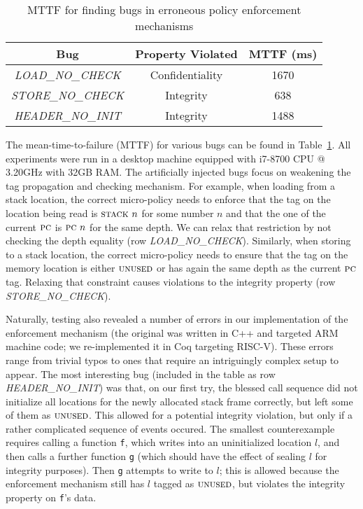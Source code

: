\documentclass[acmsmall,review,anonymous]{acmart}\settopmatter{printfolios=true,printccs=false,printacmref=false}
\begin{document}
{\begin{table}[]
\centering
\begin{tabular}{c|c|c}
  Bug & Property Violated & MTTF (ms) \\
  \hline
      {\em LOAD\_NO\_CHECK}  & Confidentiality & 1670 \\
      {\em STORE\_NO\_CHECK} & Integrity & 638 \\
      {\em HEADER\_NO\_INIT} & Integrity & 1488 \\
\end{tabular}
\vspace*{1em}
\caption{MTTF for finding bugs in erroneous policy enforcement mechanisms}
\vspace*{-2em}
\label{tab:bug-table}
\end{table}

The mean-time-to-failure (MTTF) for various bugs can be found in
Table~\ref{tab:bug-table}. All experiments were run in a desktop
machine equipped with i7-8700 CPU @ 3.20GHz with 32GB
RAM. 
%
The artificially injected bugs focus on weakening the tag propagation
and checking mechanism.
%
For example, when loading from a stack location, the correct
micro-policy needs to enforce that the tag on the location being read
is $\textsc{stack} ~ n$ for some number $n$ and that the one of the
current $\textsc{pc}$ is $\textsc{pc} ~ n$ for the same depth. We can relax
that restriction by not checking the depth equality (row {\em
  LOAD\_NO\_CHECK}).
%
Similarly, when storing to a stack location, the correct micro-policy
needs to ensure that the tag on the memory location is either
$\textsc{unused}$ or has again the same depth as the current $\textsc{pc}$
tag. Relaxing that constraint causes violations to the integrity
property (row {\em STORE\_NO\_CHECK}).

Naturally, testing also revealed a number of errors in our
implementation of the enforcement mechanism (the original was written in C++
and targeted ARM machine code;
we re-implemented it in Coq targeting RISC-V).  These errors range
from trivial typos to ones that require an intriguingly complex setup
to appear.  The most interesting bug (included in the table as row
{\em HEADER\_NO\_INIT}) was that, on our first try, the blessed call
sequence %
did not initialize all locations for the
newly allocated stack frame correctly, but left some of them as
$\textsc{unused}$. This allowed for a potential integrity violation, but
only if a rather complicated sequence of events occured.
The smallest counterexample requires calling a function {\tt f},
which writes into an uninitialized location $l$,
and then
calls a further function {\tt g} (which should have the effect of sealing $l$
for integrity purposes). Then {\tt g} attempts to write to $l$;
this is allowed because the enforcement mechanism still has
$l$ tagged as $\textsc{unused}$, but violates the integrity property on {\tt f}'s data.

}
\end{document}
